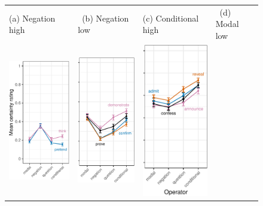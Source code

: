 \documentclass[a4paper,12pt,twoside]{article}
\begin{document}
	\begin{figure}[ht]
		\centering
		\begin{tabular}{p{.205\linewidth} p{.18\linewidth} p{.18\linewidth} p{.18\linewidth} p{.18\linewidth}}
			\footnotesize \hspace{2.1em} (a) Negation high &
			\footnotesize \ (b) Negation low &
			\footnotesize (c) Conditional high &
			\footnotesize \ (d) Modal low
			\\
			\vspace{-.6\baselineskip}
			\includegraphics[width=.225 \textwidth, valign=T]{negation-high-1.pdf}
			&
			\vspace{-.6\baselineskip}
			\includegraphics[width=.2\textwidth, valign=T]{negation-low-1.pdf}
			&
			\vspace{-.6\baselineskip}
			\includegraphics[width=.2\textwidth, valign=T]{conditional-high-1.pdf}

\end{tabular}
\end{figure}
\end{document}
